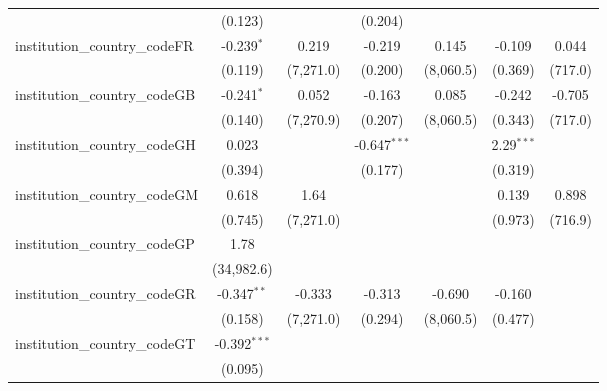 \begin{tabular}{lcccccc}
                                         & (0.123)        &               & (0.204)        &                &                &   \\   
   institution\_country\_codeFR          & -0.239$^{*}$   & 0.219         & -0.219         & 0.145          & -0.109         & 0.044\\   
                                         & (0.119)        & (7,271.0)     & (0.200)        & (8,060.5)      & (0.369)        & (717.0)\\   
   institution\_country\_codeGB          & -0.241$^{*}$   & 0.052         & -0.163         & 0.085          & -0.242         & -0.705\\   
                                         & (0.140)        & (7,270.9)     & (0.207)        & (8,060.5)      & (0.343)        & (717.0)\\   
   institution\_country\_codeGH          & 0.023          &               & -0.647$^{***}$ &                & 2.29$^{***}$   &   \\   
                                         & (0.394)        &               & (0.177)        &                & (0.319)        &   \\   
   institution\_country\_codeGM          & 0.618          & 1.64          &                &                & 0.139          & 0.898\\   
                                         & (0.745)        & (7,271.0)     &                &                & (0.973)        & (716.9)\\   
   institution\_country\_codeGP          & 1.78           &               &                &                &                &   \\   
                                         & (34,982.6)     &               &                &                &                &   \\   
   institution\_country\_codeGR          & -0.347$^{**}$  & -0.333        & -0.313         & -0.690         & -0.160         &   \\   
                                         & (0.158)        & (7,271.0)     & (0.294)        & (8,060.5)      & (0.477)        &   \\   
   institution\_country\_codeGT          & -0.392$^{***}$ &               &                &                &                &   \\   
                                         & (0.095)        &               &                &                &                &   \\   

\end{tabular}
